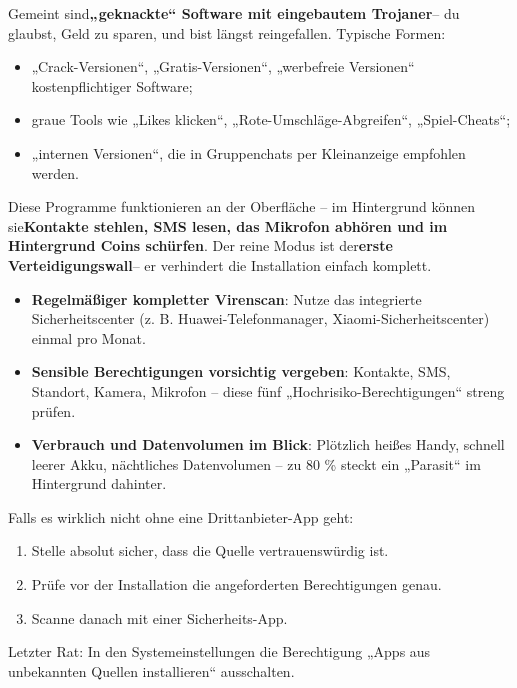 Gemeint sind\textbf{„geknackte“ Software mit eingebautem Trojaner}– du glaubst, Geld zu sparen, und bist längst reingefallen. Typische Formen:

\begin{itemize}
  \item „Crack-Versionen“, „Gratis-Versionen“, „werbefreie Versionen“ kostenpflichtiger Software;
  \item graue Tools wie „Likes klicken“, „Rote-Umschläge-Abgreifen“, „Spiel-Cheats“;
  \item „internen Versionen“, die in Gruppenchats per Kleinanzeige empfohlen werden.
\end{itemize}

Diese Programme funktionieren an der Oberfläche – im Hintergrund können sie\textbf{Kontakte stehlen, SMS lesen, das Mikrofon abhören und im Hintergrund Coins schürfen}. Der reine Modus ist der\textbf{erste Verteidigungswall}– er verhindert die Installation einfach komplett.


\begin{itemize}
  \item \textbf{Regelmäßiger kompletter Virenscan}: Nutze das integrierte Sicherheitscenter (z. B. Huawei-Telefonmanager, Xiaomi-Sicherheitscenter) einmal pro Monat.
  \item \textbf{Sensible Berechtigungen vorsichtig vergeben}: Kontakte, SMS, Standort, Kamera, Mikrofon – diese fünf „Hochrisiko-Berechtigungen“ streng prüfen.
  \item \textbf{Verbrauch und Datenvolumen im Blick}: Plötzlich heißes Handy, schnell leerer Akku, nächtliches Datenvolumen – zu 80 \% steckt ein „Parasit“ im Hintergrund dahinter.
\end{itemize}

Falls es wirklich nicht ohne eine Drittanbieter-App geht:

\begin{enumerate}
  \item Stelle absolut sicher, dass die Quelle vertrauenswürdig ist.
  \item Prüfe vor der Installation die angeforderten Berechtigungen genau.
  \item Scanne danach mit einer Sicherheits-App.
\end{enumerate}

Letzter Rat: In den Systemeinstellungen die Berechtigung „Apps aus unbekannten Quellen installieren“ ausschalten.

